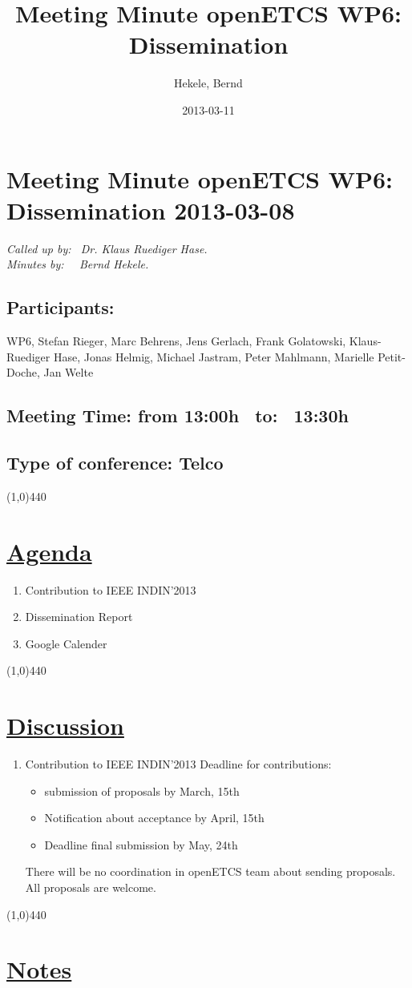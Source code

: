 \documentclass[a4paper]{article}
\title{Meeting Minute openETCS WP6: Dissemination}
\author{Hekele, Bernd}
\date{2013-03-11}
\begin{document}
\section*{\large{Meeting Minute openETCS WP6: Dissemination 2013-03-08}}

\emph{Called up by: \ Dr. Klaus Ruediger Hase.}\\
\emph{Minutes by: \ \  Bernd Hekele.}

\subsection*{Participants:} WP6, 
Stefan Rieger, 
Marc Behrens, 
Jens Gerlach, 
Frank Golatowski, 
Klaus-Ruediger Hase, 
Jonas Helmig,
Michael Jastram, 
Peter Mahlmann, 
Marielle Petit-Doche, 
Jan Welte\\


\subsection*{Meeting Time: from 13:00h \ to: \ 13:30h}

\subsection*{Type of conference: Telco}

\line(1,0){440}
\section*{\underline{Agenda}}
\begin{enumerate}
\item Contribution to IEEE INDIN'2013
\item Dissemination Report
\item Google Calender
\end{enumerate}
\line(1,0){440}
\section*{\underline{Discussion}}

\begin{enumerate}

\item Contribution to IEEE INDIN'2013\newline
Deadline for contributions:
\begin {itemize}
\item submission of proposals by March, 15th
\item Notification about acceptance by April, 15th
\item Deadline final submission by May, 24th
\end {itemize}
There will be no coordination in openETCS team about sending proposals. All proposals are welcome.

\end{enumerate}

\line(1,0){440}
\section*{\underline{Notes}}
\end{document}
